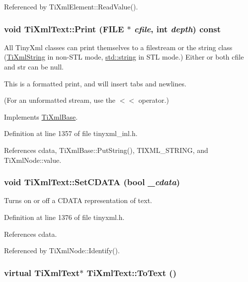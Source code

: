 Referenced by TiXmlElement::ReadValue().\hypertarget{class_ti_xml_text_ae74d56c5b3ddec6cc3103dd51821af92}{
\subsubsection[{Print}]{\setlength{\rightskip}{0pt plus 5cm}void TiXmlText::Print (FILE $\ast$ {\em cfile}, \/  int {\em depth}) const}}
\label{class_ti_xml_text_ae74d56c5b3ddec6cc3103dd51821af92}
All TinyXml classes can print themselves to a filestream or the string class (\hyperlink{class_ti_xml_string}{TiXmlString} in non-\/STL mode, \hyperlink{classstd_1_1string}{std::string} in STL mode.) Either or both cfile and str can be null.

This is a formatted print, and will insert tabs and newlines.

(For an unformatted stream, use the $<$$<$ operator.) 

Implements \hyperlink{class_ti_xml_base_a0de56b3f2ef14c65091a3b916437b512}{TiXmlBase}.

Definition at line 1357 of file tinyxml\_\-inl.h.

References cdata, TiXmlBase::PutString(), TIXML\_\-STRING, and TiXmlNode::value.\hypertarget{class_ti_xml_text_acb17ff7c5d09b2c839393445a3de5ea9}{
\subsubsection[{SetCDATA}]{\setlength{\rightskip}{0pt plus 5cm}void TiXmlText::SetCDATA (bool {\em \_\-cdata})}}
\label{class_ti_xml_text_acb17ff7c5d09b2c839393445a3de5ea9}


Turns on or off a CDATA representation of text. 

Definition at line 1376 of file tinyxml.h.

References cdata.

Referenced by TiXmlNode::Identify().\hypertarget{class_ti_xml_text_ae7c3a8fd3e4dbf6c0c4363a943d72f5b}{
\subsubsection[{ToText}]{\setlength{\rightskip}{0pt plus 5cm}virtual {\bf TiXmlText}$\ast$ TiXmlText::ToText ()}}
\label{class_ti_xml_text_ae7c3a8fd3e4dbf6c0c4363a943d72f5b}


